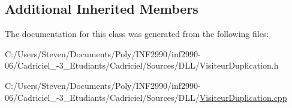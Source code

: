 \subsection*{Additional Inherited Members}


The documentation for this class was generated from the following files\+:\begin{DoxyCompactItemize}
\item 
C\+:/\+Users/\+Steven/\+Documents/\+Poly/\+I\+N\+F2990/inf2990-\/06/\+Cadriciel\+\_-\/3\+\_\+\+Etudiants/\+Cadriciel/\+Sources/\+D\+L\+L/Visiteur\+Duplication.\+h\item 
C\+:/\+Users/\+Steven/\+Documents/\+Poly/\+I\+N\+F2990/inf2990-\/06/\+Cadriciel\+\_-\/3\+\_\+\+Etudiants/\+Cadriciel/\+Sources/\+D\+L\+L/\hyperlink{_visiteur_duplication_8cpp}{Visiteur\+Duplication.\+cpp}\end{DoxyCompactItemize}
